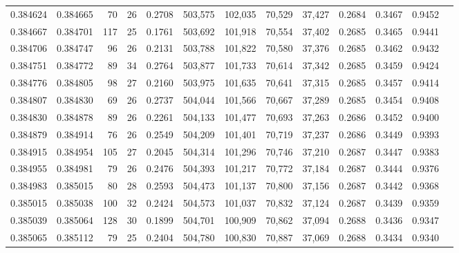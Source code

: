 \begin{tabular}{rrrrrrrrrrrrr}
0.384624 & 0.384665 &    70 &  26 &                                     0.2708 & 503,575 & 102,035 &  70,529 &  37,427 & 0.2684 & 0.3467 & 0.9452 \\
0.384667 & 0.384701 &   117 &  25 &                                     0.1761 & 503,692 & 101,918 &  70,554 &  37,402 & 0.2685 & 0.3465 & 0.9441 \\
0.384706 & 0.384747 &    96 &  26 &                                     0.2131 & 503,788 & 101,822 &  70,580 &  37,376 & 0.2685 & 0.3462 & 0.9432 \\
0.384751 & 0.384772 &    89 &  34 &                                     0.2764 & 503,877 & 101,733 &  70,614 &  37,342 & 0.2685 & 0.3459 & 0.9424 \\
0.384776 & 0.384805 &    98 &  27 &                                     0.2160 & 503,975 & 101,635 &  70,641 &  37,315 & 0.2685 & 0.3457 & 0.9414 \\
0.384807 & 0.384830 &    69 &  26 &                                     0.2737 & 504,044 & 101,566 &  70,667 &  37,289 & 0.2685 & 0.3454 & 0.9408 \\
0.384830 & 0.384878 &    89 &  26 &                                     0.2261 & 504,133 & 101,477 &  70,693 &  37,263 & 0.2686 & 0.3452 & 0.9400 \\
0.384879 & 0.384914 &    76 &  26 &                                     0.2549 & 504,209 & 101,401 &  70,719 &  37,237 & 0.2686 & 0.3449 & 0.9393 \\
0.384915 & 0.384954 &   105 &  27 &                                     0.2045 & 504,314 & 101,296 &  70,746 &  37,210 & 0.2687 & 0.3447 & 0.9383 \\
0.384955 & 0.384981 &    79 &  26 &                                     0.2476 & 504,393 & 101,217 &  70,772 &  37,184 & 0.2687 & 0.3444 & 0.9376 \\
0.384983 & 0.385015 &    80 &  28 &                                     0.2593 & 504,473 & 101,137 &  70,800 &  37,156 & 0.2687 & 0.3442 & 0.9368 \\
0.385015 & 0.385038 &   100 &  32 &                                     0.2424 & 504,573 & 101,037 &  70,832 &  37,124 & 0.2687 & 0.3439 & 0.9359 \\
0.385039 & 0.385064 &   128 &  30 &                                     0.1899 & 504,701 & 100,909 &  70,862 &  37,094 & 0.2688 & 0.3436 & 0.9347 \\
0.385065 & 0.385112 &    79 &  25 &                                     0.2404 & 504,780 & 100,830 &  70,887 &  37,069 & 0.2688 & 0.3434 & 0.9340 \\

\end{tabular}
